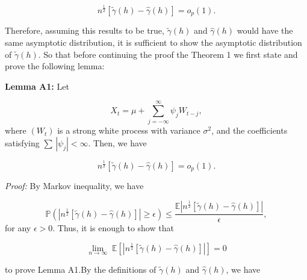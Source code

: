 \documentclass[]{book}
\theoremstyle{definition}
\theoremstyle{definition}
\theoremstyle{definition}
\theoremstyle{remark}
\begin{document}
\[
n^{\frac{1}{2}}[\tilde{\gamma} \left( h \right) - \hat \gamma \left( h \right)] = o_p(1).
\]

Therefore, assuming this results to be true,
\(\tilde{\gamma} \left( h \right)\) and \(\hat \gamma \left( h \right)\)
would have the same asymptotic distribution, it is sufficient to show
the asymptotic distribution of \(\tilde{\gamma} \left( h \right)\). So
that before continuing the proof the Theorem 1 we first state and prove
the following lemma:

\textbf{Lemma A1:} Let

\[
X_t = \mu + \sum\limits_{j = -\infty}^{\infty} \psi_j W_{t-j},
\] where \((W_t)\) is a strong white process with variance \(\sigma^2\),
and the coefficients satisfying \(\sum \, |\psi_j| < \infty\). Then, we
have

\[
n^{\frac{1}{2}}[\tilde{\gamma} \left( h \right) - \hat \gamma \left( h \right)] = o_p(1).
\]

\emph{Proof:} By Markov inequality, we have

\[
\mathbb{P}\left( |n^{\frac{1}{2}}[\tilde{\gamma} \left( h \right) - \hat \gamma \left( h \right)]| \geq \epsilon \right) \leq \frac{\mathbb{E}|n^{\frac{1}{2}}[\tilde{\gamma} \left( h \right) - \hat \gamma \left( h \right)]|}{\epsilon},
\] for any \(\epsilon > 0\). Thus, it is enough to show that

\[\mathop {\lim }\limits_{n \to \infty } \; \mathbb{E} \left[|n^{\frac{1}{2}}[\tilde{\gamma} \left( h \right) - \hat \gamma \left( h \right)]|\right] = 0\]

to prove Lemma A1.By the definitions of
\(\tilde{\gamma} \left( h \right)\) and
\(\hat \gamma \left( h \right)\), we have
\end{document}
